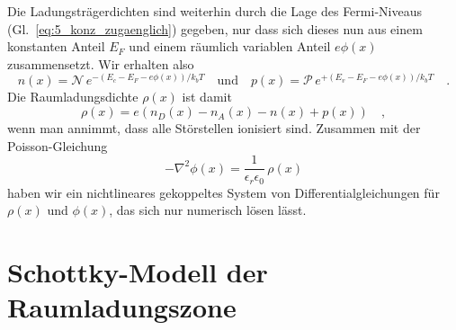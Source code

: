 Die Ladungsträgerdichten sind weiterhin durch die Lage des Fermi-Niveaus (Gl.~\ref{eq:5_konz_zugaenglich}) gegeben, nur dass sich dieses nun aus einem konstanten Anteil $E_F$ und einem räumlich variablen Anteil $e \phi(x)$ zusammensetzt. Wir erhalten also 
\begin{equation}
    n(x)  = \mathcal{N} \, e^{- (E_c - E_F - e\phi(x)) / k_b T} \quad \text{und} \quad   
    p(x) =  \mathcal{P} \, e^{+ (E_v - E_F  - e\phi(x)) / k_b T} \quad . \label{eq:5_n_of_x}
\end{equation}
Die  Raumladungsdichte $\rho(x)$ ist damit
\begin{equation}
    \rho(x) = e \left( n_D(x) - n_A(x) - n(x) + p(x) \right) \quad ,
\end{equation}
wenn man annimmt, dass alle Störstellen ionisiert sind. Zusammen mit der Poisson-Gleichung
\begin{equation}
    - \nabla^2 \phi(x) = \frac{1}{\epsilon_r \epsilon_0} \, \rho (x)
\end{equation}
haben wir ein nichtlineares gekoppeltes  System von Differentialgleichungen für $\rho(x)$ und $\phi(x)$, das sich nur numerisch lösen lässt.


\section*{Schottky-Modell der Raumladungszone}


